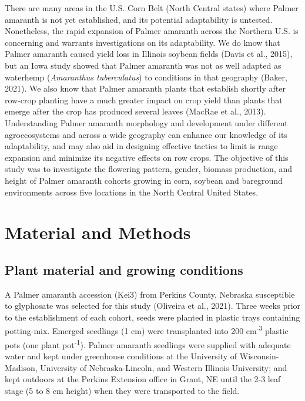 \documentclass[utf8]{frontiersSCNS}
\begin{document}
There are many areas in the U.S. Corn Belt (North Central states) where
Palmer amaranth is not yet established, and its potential adaptability
is untested. Nonetheless, the rapid expansion of Palmer amaranth across
the Northern U.S. is concerning and warrants investigations on its
adaptability. We do know that Palmer amaranth caused yield loss in
Illinois soybean fields (Davis et al., 2015), but an Iowa study showed
that Palmer amaranth was not as well adapted as waterhemp
(\emph{Amaranthus tuberculatus}) to conditions in that geography (Baker,
2021). We also know that Palmer amaranth plants that establish shortly
after row-crop planting have a much greater impact on crop yield than
plants that emerge after the crop has produced several leaves (MacRae et
al., 2013). Understanding Palmer amaranth morphology and development
under different agroecosystems and across a wide geography can enhance
our knowledge of its adaptability, and may also aid in designing
effective tactics to limit is range expansion and minimize its negative
effects on row crops. The objective of this study was to investigate the
flowering pattern, gender, biomass production, and height of Palmer
amaranth cohorts growing in corn, soybean and bareground environments
across five locations in the North Central United States.

\hypertarget{material-and-methods}{%
\section*{Material and Methods}\label{material-and-methods}}

\hypertarget{plant-material-and-growing-conditions}{%
\subsection*{Plant material and growing
conditions}\label{plant-material-and-growing-conditions}}

A Palmer amaranth accession (Kei3) from Perkins County, Nebraska
susceptible to glyphosate was selected for this study (Oliveira et al.,
2021). Three weeks prior to the establishment of each cohort, seeds were
planted in plastic trays containing potting-mix. Emerged seedlings (1
cm) were transplanted into 200 cm\textsuperscript{-3} plastic pots (one
plant pot\textsuperscript{-1}). Palmer amaranth seedlings were supplied
with adequate water and kept under greenhouse conditions at the
University of Wisconsin-Madison, University of Nebraska-Lincoln, and
Western Illinois University; and kept outdoors at the Perkins Extension
office in Grant, NE until the 2-3 leaf stage (5 to 8 cm height) when
they were transported to the field.
\end{document}
